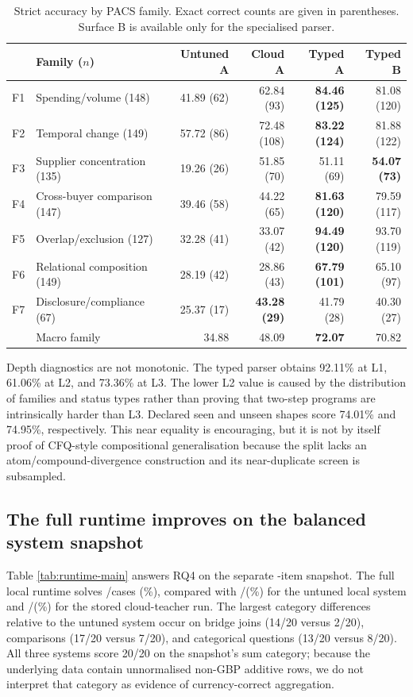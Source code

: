\begin{table}[t]
  \caption{Strict accuracy by PACS family.  Exact correct counts are given in parentheses.
  Surface B is available only for the specialised parser.}
  \label{tab:pacs-family}
  \centering
  \small
  \begin{tabular}{llrrrr}
    \toprule
    & Family ($n$) & Untuned A & Cloud A & Typed A & Typed B \\
    \midrule
    F1 & Spending/volume (148) & 41.89 (62) & 62.84 (93) & \textbf{84.46 (125)} & 81.08 (120) \\
    F2 & Temporal change (149) & 57.72 (86) & 72.48 (108) & \textbf{83.22 (124)} & 81.88 (122) \\
    F3 & Supplier concentration (135) & 19.26 (26) & 51.85 (70) & 51.11 (69) & \textbf{54.07 (73)} \\
    F4 & Cross-buyer comparison (147) & 39.46 (58) & 44.22 (65) & \textbf{81.63 (120)} & 79.59 (117) \\
    F5 & Overlap/exclusion (127) & 32.28 (41) & 33.07 (42) & \textbf{94.49 (120)} & 93.70 (119) \\
    F6 & Relational composition (149) & 28.19 (42) & 28.86 (43) & \textbf{67.79 (101)} & 65.10 (97) \\
    F7 & Disclosure/compliance (67) & 25.37 (17) & \textbf{43.28 (29)} & 41.79 (28) & 40.30 (27) \\
    \midrule
    & Macro family & 34.88 & 48.09 & \textbf{72.07} & 70.82 \\
    \bottomrule
  \end{tabular}
\end{table}

Depth diagnostics are not monotonic.  The typed parser obtains 92.11\% at L1, 61.06\% at L2,
and 73.36\% at L3.  The lower L2 value is caused by the distribution of families and status
types rather than proving that two-step programs are intrinsically harder than L3.  Declared
seen and unseen shapes score 74.01\% and 74.95\%, respectively.  This near equality is
encouraging, but it is not by itself proof of CFQ-style compositional generalisation because the
split lacks an atom/compound-divergence construction and its near-duplicate screen is
subsampled.

\subsection{The full runtime improves on the balanced system snapshot}

Table \ref{tab:runtime-main} answers RQ4 on the separate \RuntimeN{}-item snapshot.  The full local
runtime solves \RuntimeOursCorrect/\RuntimeN cases (\RuntimeOurs\%), compared with
\RuntimeBaseCorrect/\RuntimeN (\RuntimeBase\%) for the untuned local system and
\RuntimeTeacherCorrect/\RuntimeN (\RuntimeTeacher\%) for the stored cloud-teacher run.  The
largest category differences relative to the untuned system occur on bridge joins (14/20 versus
2/20), comparisons (17/20 versus 7/20), and categorical questions (13/20 versus 8/20).  All three
systems score 20/20 on the snapshot's sum category; because the underlying data contain
unnormalised non-GBP additive rows, we do not interpret that category as evidence of
currency-correct aggregation.

